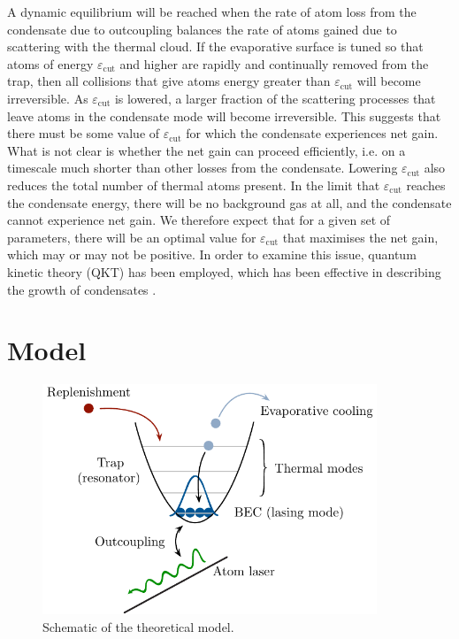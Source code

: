 A dynamic equilibrium will be reached when the rate of atom loss from the condensate due to outcoupling balances the rate of atoms gained due to scattering with the thermal cloud.  If the evaporative surface is tuned so that atoms of energy $\varepsilon_\text{cut}$ and higher are rapidly and continually removed from the trap, then all collisions that give atoms energy greater than $\varepsilon_\text{cut}$ will become irreversible. As $\varepsilon_\text{cut}$ is lowered, a larger fraction of the scattering processes that leave atoms in the condensate mode will become irreversible. This suggests that there must be some value of $\varepsilon_\text{cut}$ for which the condensate experiences net gain. What is not clear is whether the net gain can proceed efficiently, i.e. on a timescale much shorter than other losses from the condensate.  Lowering $\varepsilon_\text{cut}$ also reduces the total number of thermal atoms present. In the limit that $\varepsilon_\text{cut}$ reaches the condensate energy, there will be no background gas at all, and the condensate cannot experience net gain.  We therefore expect that for a given set of parameters, there will be an optimal value for $\varepsilon_\text{cut}$ that maximises the net gain, which may or may not be positive. In order to examine this issue, quantum kinetic theory (QKT) \citep{Gardiner:1997tz,Jaksch:1997ug,Gardiner:1998wx,Jaksch:1998sj,Gardiner:2000ug,Lee:2000vs,Davis:2000vn} has been employed, which has been effective in describing the growth of condensates \citep{Davis:2000vn}.

\section{Model}
\label{KineticTheory:Model}

\begin{figure}
    \centering
        \includegraphics[width=10cm]{QKTModel2}
    \caption{Schematic of the theoretical model.}
    \label{KineticTheory:QKTModel}
\end{figure}

